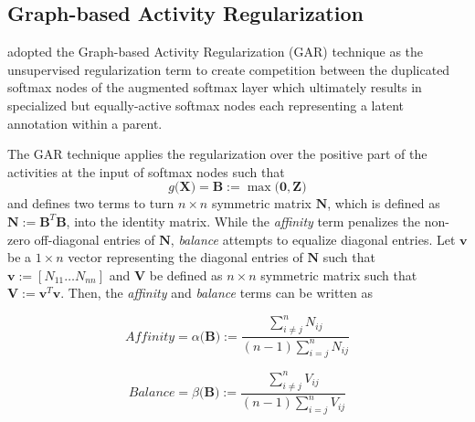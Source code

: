 \documentclass{article} \usepackage{iclr2018_conference,times}
\begin{document}
\subsection{Graph-based Activity Regularization} 

\citet{KilincU17ACOL} adopted the Graph-based Activity Regularization (GAR) technique \citep{KilincU17GAR} as the unsupervised regularization term to create competition between the duplicated softmax nodes of the augmented softmax layer which ultimately results in specialized but equally-active softmax nodes each representing a latent annotation within a parent.

The GAR technique applies the regularization over the positive part of the activities at the input of softmax nodes such that 
\begin{equation}
\label{eq:pseudo_garpredictions}
g\big(\boldsymbol{X}\big) = 
\boldsymbol{B} := 
\max{\big(\boldsymbol{0}, \boldsymbol{Z}\big)}
\end{equation}
and defines two terms to turn $n \times n$ symmetric matrix $\boldsymbol{N}$, which is defined as  $\boldsymbol{N}:=\boldsymbol{B}^T\boldsymbol{B}$, into the identity matrix. While the \textit{affinity} term penalizes the non-zero off-diagonal entries of $\boldsymbol{N}$, \textit{balance} attempts to equalize diagonal entries. Let $\boldsymbol{v}$ be a $1 \times n$ vector representing the diagonal entries of $\boldsymbol{N}$ such that $\boldsymbol{v}:=[N_{11} \dots N_{nn}]$ and $\boldsymbol{V}$ be defined as $n \times n$ symmetric matrix such that $\boldsymbol{V}:=\boldsymbol{v}^T\boldsymbol{v}$. Then, the \textit{affinity} and \textit{balance} terms can be written as

\begin{minipage}{0.5\linewidth}
	\begin{equation}
	\label{eq:pseudo_affinity}
	\textit{Affinity} = \alpha\big(\boldsymbol{B}\big) :=\frac{\sum\limits_{i \ne j}^n{N_{ij}}}{(n-1)\sum\limits_{i = j}^n{N_{ij}}}
	\end{equation}
\end{minipage}\begin{minipage}{0.5\linewidth}
	\begin{equation}
	\label{eq:pseudo_balance}
	\textit{Balance} = \beta\big(\boldsymbol{B}\big) := \frac{\sum\limits_{i \ne j}^n{V_{ij}}}{(n-1)\sum\limits_{i = j}^n{V_{ij}}}
	\end{equation}
\end{minipage}
\end{document}
